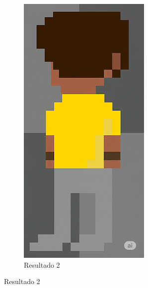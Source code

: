 \begin{figure}[htbp]
    \begin{subfigure}{0.3\linewidth}
        \includegraphics[width=1\linewidth]{figs/geminiPro/chat5/tela4_res3.png}
        \caption{\small Resultado 2}
        \label{fig:geminiPro14b}
    \end{subfigure}
\end{figure}

